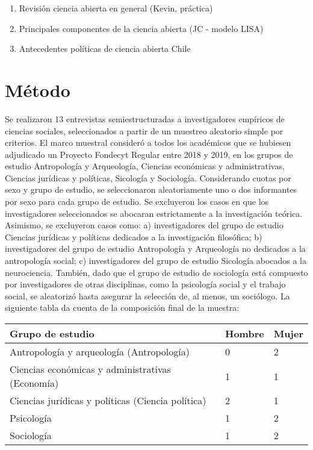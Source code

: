 \documentclass[
  letterpaper,
  DIV=11,
  numbers=noendperiod]{scrreprt}
\begin{document}
\begin{enumerate}
\def\labelenumi{\alph{enumi})}
\item
  Revisión ciencia abierta en general (Kevin, práctica)
\item
  Principales componentes de la ciencia abierta (JC - modelo LISA)
\item
  Antecedentes políticas de ciencia abierta Chile
\end{enumerate}


\hypertarget{muxe9todo}{%
\chapter{Método}\label{muxe9todo}}

Se realizaron 13 entrevistas semiestructuradas a investigadores
empíricos de ciencias sociales, seleccionados a partir de un muestreo
aleatorio simple por criterios. El marco muestral consideró a todos los
académicos que se hubiesen adjudicado un Proyecto Fondecyt Regular entre
2018 y 2019, en los grupos de estudio Antropología y Arqueología,
Ciencias económicas y administrativas, Ciencias jurídicas y políticas,
Sicología y Sociología. Considerando cuotas por sexo y grupo de estudio,
se seleccionaron aleatoriamente uno o dos informantes por sexo para cada
grupo de estudio. Se excluyeron los casos en que los investigadores
seleccionados se abocaran estrictamente a la investigación teórica.
Asimismo, se excluyeron casos como: a) investigadores del grupo de
estudio Ciencias jurídicas y políticas dedicados a la investigación
filosófica; b) investigadores del grupo de estudio Antropología y
Arqueología no dedicados a la antropología social; c) investigadores del
grupo de estudio Sicología abocados a la neurociencia. También, dado que
el grupo de estudio de sociología está compuesto por investigadores de
otras disciplinas, como la psicología social y el trabajo social, se
aleatorizó hasta asegurar la selección de, al menos, un sociólogo. La
siguiente tabla da cuenta de la composición final de la muestra:

\begin{longtable}[]{@{}lll@{}}
\toprule()
Grupo de estudio & Hombre & Mujer \\
\midrule()
\endhead
Antropología y arqueología (Antropología) & 0 & 2 \\
Ciencias económicas y administrativas (Economía) & 1 & 1 \\
Ciencias jurídicas y políticas (Ciencia política) & 2 & 1 \\
Psicología & 1 & 2 \\
Sociología & 1 & 2 \\
\bottomrule()
\end{longtable}
\end{document}
